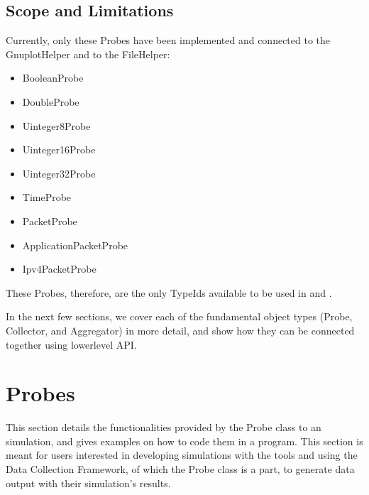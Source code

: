 \documentclass[letterpaper,10pt,english]{sphinxmanual}
\renewcommand{\sphinxcode}[1]{\texttt{\small{#1}}}
\begin{document}
\subsection{Scope and Limitations}
\label{\detokenize{data-collection-helpers:scope-and-limitations}}
Currently, only these Probes have been implemented and connected
to the GnuplotHelper and to the FileHelper:
\begin{itemize}
\item {} 
BooleanProbe

\item {} 
DoubleProbe

\item {} 
Uinteger8Probe

\item {} 
Uinteger16Probe

\item {} 
Uinteger32Probe

\item {} 
TimeProbe

\item {} 
PacketProbe

\item {} 
ApplicationPacketProbe

\item {} 
Ipv4PacketProbe

\end{itemize}

These Probes, therefore, are the only TypeIds available to be used
in \sphinxcode{} and \sphinxcode{}.

In the next few sections, we cover each of the fundamental object
types (Probe, Collector, and Aggregator) in more detail, and show
how they can be connected together using lower\sphinxhyphen{}level API.


\section{Probes}
\label{\detokenize{probe:probes}}\label{\detokenize{probe::doc}}
This section details the functionalities provided by the Probe class
to an  simulation, and gives examples on how to code them in a
program. This section is meant for users interested in developing
simulations with the  tools and using the Data Collection
Framework, of which the Probe class is a part, to generate data output
with their simulation’s results.
\end{document}
